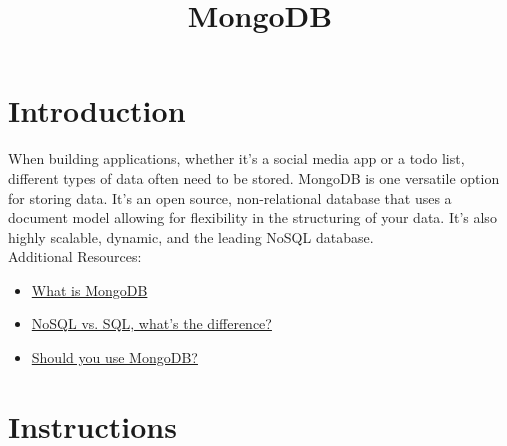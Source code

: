 \documentclass{42-en}
\begin{document}
\title{MongoDB}
\maketitle

\tableofcontents

\chapter{Introduction}

When building applications, whether it's a social media app or a todo list, different types of data often need to be stored. MongoDB is one versatile option for storing data. It's an open source, non-relational database that uses a document model allowing for flexibility in the structuring of your data. It’s also highly scalable, dynamic, and the leading NoSQL database. \\

Additional Resources:
\begin{itemize}\itemsep1pt
\item \href{https://www.mongodb.com/what-is-mongodb}{What is MongoDB}
\item \href{https://medium.com/xplenty-blog/the-sql-vs-nosql-difference-mysql-vs-mongodb-32c9980e67b2}{NoSQL vs. SQL, what's the difference?}
\item \href{https://www.upwork.com/hiring/data/should-you-use-mongodb-a-look-at-the-leading-nosql-database}{Should you use MongoDB?}
\end{itemize}

\chapter{Instructions}
\end{document}
